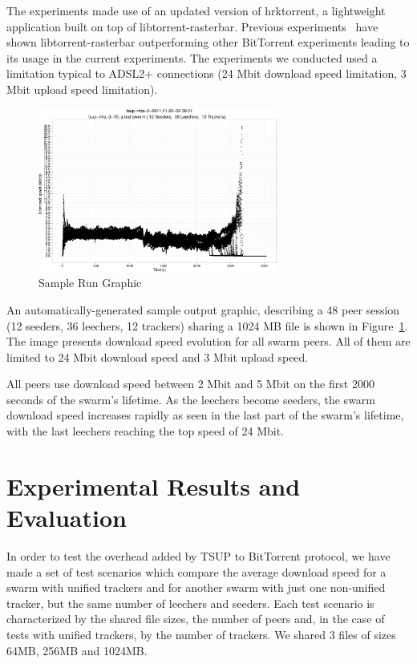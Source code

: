 The experiments made use of an updated version of hrktorrent, a lightweight
application built on top of libtorrent-rasterbar. Previous
experiments~\cite{bt-vi} have shown libtorrent-rasterbar outperforming other
BitTorrent experiments leading to its usage in the current experiments. The
experiments we conducted used a limitation typical to ADSL2+ connections (24
Mbit download speed limitation, 3 Mbit upload speed limitation).

\begin{figure}[h]
  \begin{center}
    \includegraphics[width=0.7\textwidth]{src/img/unified-tracker/tsup-sample-run-48peers}
  \end{center}
  \caption{Sample Run Graphic}
  \label{fig:unified-tracker:tsup-sample-run}
\end{figure}

An automatically-generated sample output graphic, describing a 48 peer session
(12 seeders, 36 leechers, 12 trackers) sharing a 1024 MB file is shown in
Figure~\ref{fig:unified-tracker:tsup-sample-run}. The image presents download
speed evolution for all swarm peers. All of them are limited to 24 Mbit
download speed and 3 Mbit upload speed.

All peers use download speed between 2 Mbit and 5 Mbit on the first 2000
seconds of the swarm's lifetime. As the leechers become seeders, the swarm
download speed increases rapidly as seen in the last part of the swarm's
lifetime, with the last leechers reaching the top speed of 24 Mbit.

\section{Experimental Results and Evaluation}
\label{sec:unified-tracker:results}

In order to test the overhead added by TSUP to BitTorrent protocol, we have
made a set of test scenarios which compare the average download speed for a
swarm with unified trackers and for another swarm with just one non-unified
tracker, but the same number of leechers and seeders. Each test scenario is
characterized by the shared file sizes, the number of peers and, in the case
of tests with unified trackers, by the number of trackers. We shared 3 files
of sizes 64MB, 256MB and 1024MB.

